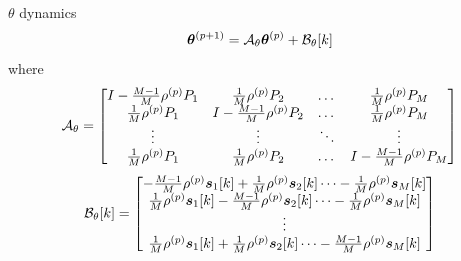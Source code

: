 \documentclass[aspectratio=169]{beamer}
\begin{document}
\begin{frame}{$\theta$ dynamics}{\hyperlink{analysis_continued}{}}
  \hypertarget{theta_dynamics}{}
  \begin{equation*}
    \vec{\theta}\pplusone=\mathcal{A}_{\theta}\vec{\theta}\p+\mathcal{\vec{B}}_{\theta}[k]
  \end{equation*}
  where
  \begin{equation*}
    \mathcal{A}_{\theta}=\left[
      \begin{matrix}
        I-\frac{M-1}{M}\rho\p \Plin[1] & \frac{1}{M}\rho\p \Plin[2]&\dots&\frac{1}{M}\rho\p \Plin[M]\\
        \frac{1}{M}\rho\p \Plin[1]&I-\frac{M-1}{M}\rho\p \Plin[2]&\dots&\frac{1}{M}\rho\p \Plin[M]\\
        \vdots&\vdots&\ddots&\vdots\\
        \frac{1}{M}\rho\p \Plin[1]&\frac{1}{M}\rho\p \Plin[2]&\dots&I-\frac{M-1}{M}\rho\p \Plin[M]\\
      \end{matrix}
    \right]
  \end{equation*}
  \begin{equation*}
    \mathcal{\vec{B}}_{\theta}[k]=\left[
      \begin{matrix}
        -\frac{M-1}{M}\rho\p \vec{s}_{1}[k]+\frac{1}{M}\rho\p \vec{s}_{2}[k]\dots-\frac{1}{M}\rho\p \vec{s}_{M}[k]\\
        \frac{1}{M}\rho\p \vec{s}_{1}[k]-\frac{M-1}{M}\rho\p \vec{s}_{2}[k] \dots-\frac{1}{M}\rho\p \vec{s}_{M}[k]\\
        \vdots\\
        \frac{1}{M}\rho\p \vec{s}_{1}[k]+\frac{1}{M}\rho\p \vec{s}_{2}[k]\dots-\frac{M-1}{M}\rho\p \vec{s}_{M}[k]\\
      \end{matrix}
    \right]
  \end{equation*}
\end{frame}
\end{document}
